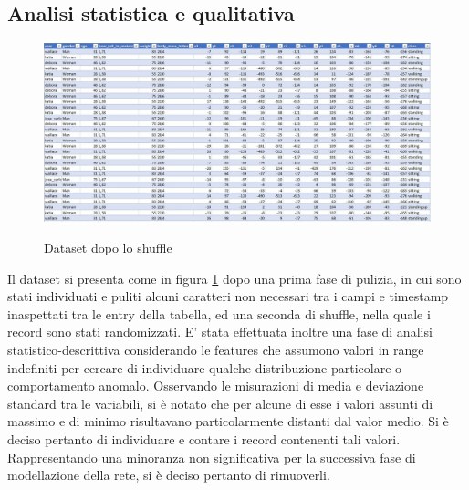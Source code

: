\documentclass[12pt]{article}
\begin{document}
\subsection{Analisi statistica e qualitativa}
\begin{figure}[H]
	\centering
	{\includegraphics[width=1\textwidth]{images/dataset.JPG}}
	\caption{Dataset dopo lo shuffle}
	\label{fig:dataset}
\end{figure}
Il dataset si presenta come in figura \ref{fig:dataset} dopo una prima fase di pulizia, in cui sono stati individuati e puliti alcuni caratteri non necessari tra i campi e timestamp inaspettati tra le entry della tabella, ed una seconda di shuffle, nella quale i record sono stati randomizzati. \newline
E' stata effettuata inoltre una fase di analisi statistico-descrittiva considerando le features che assumono valori in range indefiniti per cercare di individuare qualche distribuzione particolare o comportamento anomalo. Osservando le misurazioni di media e deviazione standard tra le variabili, si è notato che per alcune di esse i valori assunti di massimo e di minimo risultavano particolarmente distanti dal valor medio. Si è deciso pertanto di individuare e contare i record contenenti tali valori. Rappresentando una minoranza non significativa per la successiva fase di modellazione della rete, si è deciso pertanto di rimuoverli.
\end{document}
